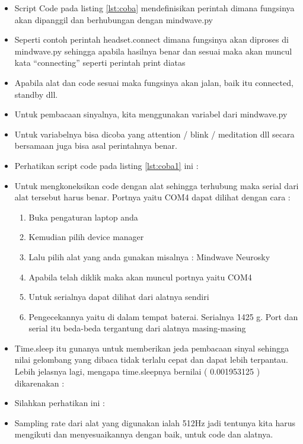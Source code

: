 \begin{itemize}
\item Script Code pada listing \ref{lst:coba} mendefinisikan perintah dimana fungsinya akan dipanggil dan berhubungan dengan mindwave.py
\item Seperti contoh perintah headset.connect dimana fungsinya akan diproses di mindwave.py sehingga apabila hasilnya benar dan sesuai maka akan muncul kata “connecting” seperti perintah print diatas
\item Apabila alat dan code sesuai maka fungsinya akan jalan, baik itu connected, standby dll.
\item Untuk pembacaan sinyalnya, kita menggunakan variabel dari mindwave.py 
\item Untuk variabelnya bisa dicoba yang attention / blink / meditation dll secara bersamaan juga bisa asal perintahnya benar. 
\item Perhatikan script code pada listing \ref{lst:coba1} ini :

\item Untuk mengkoneksikan code dengan alat sehingga terhubung maka serial dari alat tersebut harus benar. Portnya yaitu COM4 dapat dilihat dengan cara :
\begin{enumerate}
\item Buka pengaturan laptop anda 
\item Kemudian pilih device manager 
\item Lalu pilih alat yang anda gunakan misalnya : Mindwave Neurosky 
\item Apabila telah diklik maka akan muncul portnya yaitu COM4  
\item Untuk serialnya dapat dilihat dari alatnya sendiri  
\item Pengecekannya yaitu di dalam tempat baterai. Serialnya 1425 g. Port dan serial itu beda-beda tergantung dari alatnya masing-masing 
\end{enumerate}
\item Time.sleep itu gunanya untuk memberikan jeda pembacaan sinyal sehingga nilai gelombang yang dibaca tidak terlalu cepat dan dapat lebih terpantau. Lebih jelasnya lagi, mengapa time.sleepnya bernilai ( 0.001953125 ) dikarenakan : 
\item Silahkan perhatikan ini :
\item Sampling rate dari alat yang digunakan ialah 512Hz jadi tentunya kita harus mengikuti dan menyesuaikannya dengan baik, untuk code dan alatnya.

\end{itemize}
